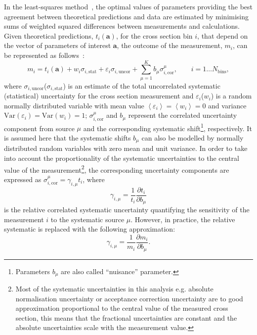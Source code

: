 In the least-squares method~\cite{Behnke:2013pga}, the optimal values of parameters providing the best agreement between theoretical predictions and data are estimated by minimising sums of weighted squared differences between measurements and calculations. Given theoretical predictions, $t_i\left( \mathbf{a} \right)$, for the cross section bin $i$, that depend on the vector of parameters of interest $\mathbf{a}$, the outcome of the measurement, $m_i$, can be represented as follows~\cite{Stump:2001gu,Botje:2001fx}:
\begin{equation}
 m_i = t_i\left( \mathbf{a} \right) + w_{i}\sigma_{i,\text{stat}} + \varepsilon_{i} \sigma_{i,\text{uncor}} + \sum_{\mu=1}^{K}{b_{\mu}\sigma_{i,\text{cor}}^\mu}, \qquad i=1\ldots N_\text{bins},
\label{eq:measmodel}
\end{equation}
where $\sigma_{i,\text{uncor}}$($\sigma_{i,\text{stat}}$) is an estimate of the total uncorrelated systematic (statistical) uncertainty for the cross section measurement and $\varepsilon_{i}$($w_{i}$)  is a random normally distributed variable with mean value $\left\langle \varepsilon_{i}\right\rangle = \left\langle w_{i} \right\rangle = 0$ and variance $\text{Var}\left( \varepsilon_{i}\right) = \text{Var}\left( w_{i}\right)  = 1$; $\sigma_{i,\text{cor}}^\mu$ and $b_{\mu}$ represent the correlated uncertainty component from source $\mu$ and the corresponding systematic shift\footnote{Parameters $b_\mu$ are also called ``nuisance'' parameter.}, respectively. It is assumed here that the systematic shifts $b_{\mu}$ can also be modelled by normally distributed random variables with zero mean and unit variance. In order to take into account the proportionality of the systematic uncertainties to the central value of the measurement\footnote{Most of the systematic uncertainties in this analysis e.g. absolute normalisation uncertainty or acceptance correction uncertainty are to good approximation proportional to the central value of the measured cross section, this means that the fractional uncertainties are constant and the absolute uncertainties scale with the measurement value.}, the corresponding uncertainty components are expressed as $\sigma_{i,\text{cor}}^\mu = \gamma_{i,\mu}t_i$, where 
\begin{equation}
\gamma_{i,\mu}=\frac{1}{{t_i}} \frac{\partial t_i}{\partial b_{\mu}}
\end{equation}
is the relative correlated systematic uncertainty quantifying the sensitivity of the measurement $i$ to the systematic source $\mu$. However, in practice, the relative systematic is replaced with the following approximation:
\begin{equation}
\gamma_{i,\mu}=\frac{1}{{m_i}} \frac{\partial m_i}{\partial b_{\mu}}.
\end{equation}

